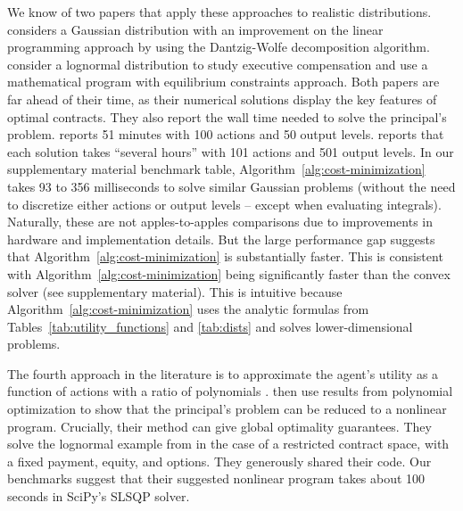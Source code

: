 We know of two papers that apply these approaches to realistic distributions. \textcite{prescott2004computing} considers a Gaussian distribution with an improvement on the linear programming approach by using the Dantzig-Wolfe decomposition algorithm. \textcite{armstrong2007stock} consider a lognormal distribution to study executive compensation and use a mathematical program with equilibrium constraints approach. Both papers are far ahead of their time, as their numerical solutions display the key features of optimal contracts. They also report the wall time needed to solve the principal's problem. \textcite{prescott2004computing} reports 51 minutes with 100 actions and 50 output levels. \textcite{armstrong2007stock} reports that each solution takes ``several hours'' with 101 actions and 501 output levels. In our supplementary material benchmark table, Algorithm~\ref{alg:cost-minimization} takes 93 to 356 milliseconds to solve similar Gaussian problems (without the need to discretize either actions or output levels -- except when evaluating integrals). Naturally, these are not apples-to-apples comparisons due to improvements in hardware and implementation details. But the large performance gap suggests that Algorithm~\ref{alg:cost-minimization} is substantially faster. This is consistent with Algorithm~\ref{alg:cost-minimization} being significantly faster than the convex solver (see supplementary material). This is intuitive because Algorithm~\ref{alg:cost-minimization} uses the analytic formulas from Tables~\ref{tab:utility_functions} and \ref{tab:dists} and solves lower-dimensional problems.

The fourth approach in the literature is to approximate the agent's utility as a function of actions with a ratio of polynomials \parencite{renner2015polynomial}. \textcite{renner2015polynomial} then use results from polynomial optimization to show that the principal's problem can be reduced to a nonlinear program. Crucially, their method can give global optimality guarantees. They solve the lognormal example from \textcite{armstrong2007stock} in the case of a restricted contract space, with a fixed payment, equity, and options. They generously shared their code. Our benchmarks suggest that their suggested nonlinear program takes about 100 seconds in SciPy's SLSQP solver.


